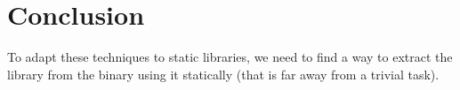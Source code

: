 \documentclass{article}
\begin{document}
    
    \section{Conclusion}
    To adapt
    these techniques to static libraries, we need to find a way to extract the
    library from the binary using it statically (that is far away from a
    trivial task). 
    

\iffalse    
    \subsection{Other tools}

		\subsubsection{Coccinelle} 
            Coccinelle uses static analysis to find pattern in C source code.
            Using a known bug as a pattern leads to discover if the patch was
            applied or not. It seems not to be interesting in our case,
            because we deal with binaries.  
        \subsubsection{n-gram}
\fi
\end{document}
